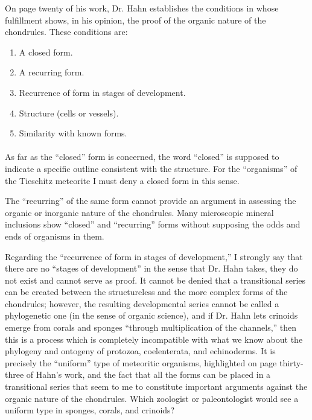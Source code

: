 \documentclass[a4paper, 12pt, oneside]{article}
\begin{document}
On page twenty of his work, Dr. Hahn establishes the conditions in whose fulfillment shows, in his opinion, the proof of the organic nature of the chondrules. These conditions are:
\begin{enumerate}
    \item A closed form.
    \item A recurring form.
    \item Recurrence of form in stages of development.
    \item Structure (cells or vessels).
    \item Similarity with known forms.
\end{enumerate}
\paragraph*{}
As far as the ``closed'' form is concerned, the word ``closed'' is supposed to indicate a specific outline consistent with the structure. For the ``organisms'' of the Tieschitz meteorite I must deny a closed form in this sense.

The ``recurring'' of the same form cannot provide an argument in assessing the organic or inorganic nature of the chondrules. Many microscopic mineral inclusions show ``closed'' and ``recurring'' forms without supposing the odds and ends of organisms in them.

Regarding the ``recurrence of form in stages of development,'' I strongly say that there are no ``stages of development'' in the sense that Dr. Hahn takes, they do not exist and cannot serve as proof. It cannot be denied that a transitional series can be created between the structureless and the more complex forms of the chondrules; however, the resulting developmental series cannot be called a phylogenetic one (in the sense of organic science), and if Dr. Hahn lets crinoids emerge from corals and sponges ``through multiplication of the channels,'' then this is a process which is completely incompatible with what we know about the phylogeny and ontogeny of protozoa, coelenterata, and echinoderms. It is precisely the ``uniform'' type of meteoritic organisms, highlighted on page thirty-three of Hahn's work, and the fact that all the forms can be placed in a transitional series that seem to me to constitute important arguments against the organic nature of the chondrules. Which zoologist or paleontologist would see a uniform type in sponges, corals, and crinoids?
\end{document}
